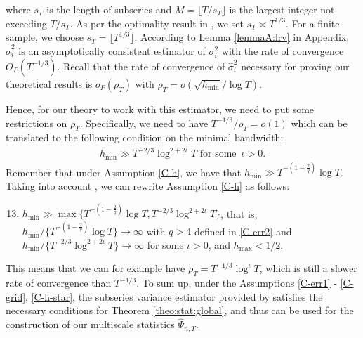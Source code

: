\documentclass[a4paper,12pt]{article}
\makeatletter
\renewcommand{\eqref}[1]{\tagform@{\ref{#1}}}
\makeatother
\begin{document}
where $s_T$ is the length of subseries and $M = \lfloor T/s_T\rfloor$ is the largest integer not exceeding $T/s_T$. As per the optimality result in \cite{Carlstein1986}, we set $s_T \asymp T^{1/3}$. For a finite sample, we choose $s_T = \lfloor T^{1/3}\rfloor$. According to  Lemma \ref{lemmaA:lrv} in Appendix, $\widehat{\sigma}_i^2$ is an asymptotically consistent estimator of $\sigma_i^2$ with the rate of convergence $O_P(T^{-1/3})$. Recall that the rate of convergence of $\widehat{\sigma}^2_i$ necessary for proving our theoretical results is $o_P(\rho_T)$ with $\rho_T = o(\sqrt{h_{\min}}/\log T)$. {\color{black}Hence, for our theory to work with this estimator, we need to put some restrictions on $\rho_T$. Specifically, we need to have \linebreak $T^{-1/3}/\rho_T = o(1)$ which can be translated to the following condition on the minimal bandwidth:
\begin{align}\label{eq:hmin}
h_{\min} \gg T^{-2/3}\log^{2+2\iota} T \text{ for some} \,\,\, \iota >0.
\end{align} Remember that under Assumption \ref{C-h}, we have that $h_{\min} \gg T^{- \left(1 - \frac{2}{q}\right)}\log T$. Taking into account \eqref{eq:hmin}, we can rewrite Assumption \ref{C-h} as follows:

\begin{enumerate}[label=(C\arabic*$^\ast$),leftmargin=1.40cm]
\setcounter{enumi}{12}
\item \label{C-h-star} $h_{\min} \gg \max\{ T^{-(1-\frac{2}{q})} \log T, T^{-2/3}\log^{2+2\iota}  T \}$, that is, $h_{\min} / \{ T^{-(1-\frac{2}{q})} \log T \} \rightarrow \infty$ with $q > 4$ defined in \ref{C-err2} and $h_{\min} / \{ T^{-2/3}\log^{2+2\iota}  T \} \rightarrow \infty$ for some $\iota >0$, and $h_{\max} < 1/2$.
\end{enumerate}

This means that we can for example have $\rho_T = T^{-1/3}\log^\iota T$, which is still a slower rate of convergence than $T^{-1/3}$. To sum up, under the Assumptions \ref{C-err1} - \ref{C-grid}, \ref{C-h-star}, the subseries variance estimator provided by \eqref{eq:lrv} satisfies the necessary conditions for Theorem \ref{theo:stat:global}, and thus can be used for the construction of our multiscale statistics $\widehat{\Psi}_{n, T}$.}
\end{document}

